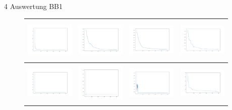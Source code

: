 \documentclass{ocbeameruni}
\begin{document}
\begin{frame}{4 Auswertung BB1}
    \begin{center}
    \begin{figure}
    \begin{tabular}{|c|c|c|c|} 
      \hline
      \includegraphics[width=23mm, height=20mm]{plots/bb1_naive.png} 
    & \includegraphics[width=23mm, height=20mm]{plots/bb1_ga_simple.png} 
    & \includegraphics[width=23mm, height=20mm]{plots/bb1_ga_gray.png}
    & \includegraphics[width=23mm, height=20mm]{plots/bb1_ga_float.png} \\ \hline
      \includegraphics[width=23mm, height=20mm]{plots/bb1_hc.png} 
    & \includegraphics[width=23mm, height=20mm]{plots/bb1_hc_sa.png} 
    & \includegraphics[width=23mm, height=20mm]{plots/bb1_hc_rs.png}
    & \includegraphics[width=23mm, height=20mm]{plots/bb1_sa.png} \\ \hline

\end{tabular}
\end{figure}
\end{center}
\end{frame}
\end{document}
